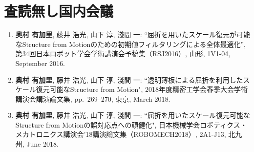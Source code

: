 \section*{査読無し国内会議}
\mbox{}

\begin{enumerate}

\item
\textbf{奥村 有加里}, 藤井 浩光, 山下 淳, 淺間 一: ``屈折を用いたスケール復元が可能なStructure from Motionのための初期値フィルタリングによる全体最適化”, 第34回日本ロボット学会学術講演会予稿集（RSJ2016）, 山形, 1V1-04, September 2016.
\\

\item
\textbf{奥村 有加里}, 藤井 浩光, 山下 淳, 淺間 一: ``透明薄板による屈折を利用したスケール復元可能なStructure from Motion", 2018年度精密工学会春季大会学術講演会講演論文集, pp.~269--270, 東京, March 2018.
\\

\item
\textbf{奥村 有加里}, 藤井 浩光, 山下 淳, 淺間 一: ``屈折を用いたスケール復元可能なStructure from Motionの誤対応点への頑健化", 日本機械学会ロボティクス・メカトロニクス講演会’18講演論文集（ROBOMECH2018）, 2A1-J13, 北九州, June 2018.
\\

\end{enumerate}




%
%


